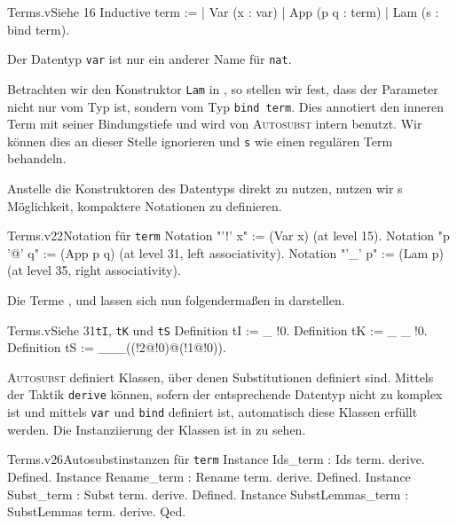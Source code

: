 \begin{code}[term]{Terms.v}{Siehe }{16}
Inductive term :=
  | Var (x : var)
  | App (p q : term)
  | Lam (s : {bind term}).
\end{code}

\begin{remark}
    Der Datentyp \texttt{var} ist nur ein anderer Name für \texttt{nat}.
\end{remark}

Betrachten wir den Konstruktor \texttt{Lam} in , so stellen wir fest, dass der Parameter nicht nur vom Typ  ist, sondern vom Typ \texttt{{bind term}}. Dies annotiert den inneren Term mit seiner Bindungstiefe und wird von \textsc{Autosubst} intern benutzt. Wir können dies an dieser Stelle ignorieren und \texttt{s} wie einen regulären Term behandeln. 

Anstelle die Konstruktoren des Datentyps direkt zu nutzen, nutzen wir \coq s Möglichkeit, kompaktere Notationen zu definieren.

\begin{ccode}[termnot]{Terms.v}{}{22}{Notation für \texttt{term}}
Notation "'!' x" := (Var x) (at level 15).
Notation "p '@' q" := (App p q) 
    (at level 31, left associativity).
Notation "'\_' p" := (Lam p) (at level 35, right associativity).     
\end{ccode}

Die Terme \tI, \tK{} und \tS{} lassen sich nun folgendermaßen in  darstellen.
\begin{ccode}[SKI]{Terms.v}{Siehe }{31}{\texttt{tI}, \texttt{tK} und \texttt{tS}}
Definition tI := \_ !0.
Definition tK := \_ \_ !0.
Definition tS := \_\_\_((!2@!0)@(!1@!0)).
\end{ccode}

\textsc{Autosubst} definiert Klassen, über denen Substitutionen definiert sind. Mittels der Taktik \texttt{derive} können, sofern der entsprechende Datentyp nicht zu komplex ist und mittels \texttt{var} und \texttt{bind} definiert ist, automatisch diese Klassen erfüllt werden. Die Instanziierung der Klassen ist in  zu sehen.

\begin{ccode}[terminst]{Terms.v}{}{26}{Autosubstinstanzen für \texttt{term}}
Instance Ids_term : Ids term. derive. Defined.
Instance Rename_term : Rename term. derive. Defined.
Instance Subst_term : Subst term. derive. Defined.
Instance SubstLemmas_term : SubstLemmas term. derive. Qed.
\end{ccode}

